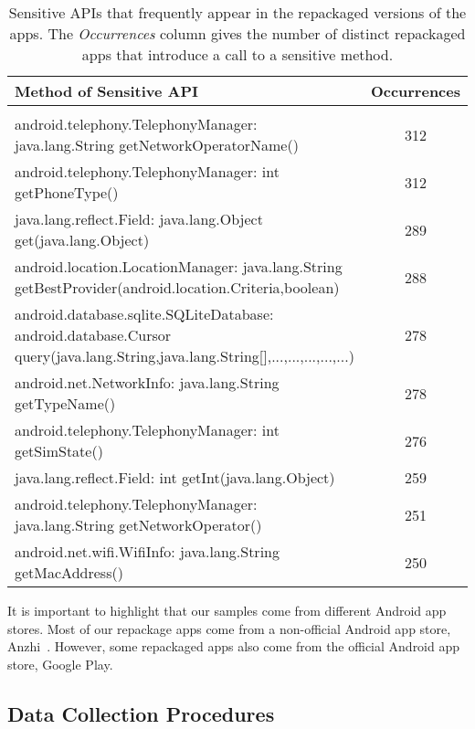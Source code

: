 \begin{table*}[ht]
  \caption{Sensitive APIs that frequently appear in the repackaged versions of the apps. The
    \emph{Occurrences} column gives the number of distinct repackaged apps that introduce a call
  to a sensitive method.}
\centering
  \begin{tabular}{lc}

    \hline
    Method of Sensitive API & Occurrences \\
    \hline \\
    android.telephony.TelephonyManager: java.lang.String getNetworkOperatorName() &  312\\
    android.telephony.TelephonyManager: int getPhoneType() &  312 \\
    java.lang.reflect.Field: java.lang.Object get(java.lang.Object) &  289 \\
    android.location.LocationManager: java.lang.String getBestProvider(android.location.Criteria,boolean) &  288 \\
    android.database.sqlite.SQLiteDatabase: android.database.Cursor query(java.lang.String,java.lang.String[],...,...,...,...,...) &  278 \\
    android.net.NetworkInfo: java.lang.String getTypeName() &  278\\
    android.telephony.TelephonyManager: int getSimState() &	276\\
    java.lang.reflect.Field: int getInt(java.lang.Object) &  259\\
    
    android.telephony.TelephonyManager: java.lang.String getNetworkOperator() &  251\\
    android.net.wifi.WifiInfo: java.lang.String getMacAddress()	& 250


    
\\\hline
\end{tabular}
\label{tab:APIused}
\end{table*}

It is important to highlight that our samples come from different Android app stores. Most of our repackage apps come from a non-official
Android app store, Anzhi~\cite{anzhi}. However, some repackaged apps also come from the official Android app store, Google Play.


\subsection{Data Collection Procedures} \label{sec:dataCollectionProc}

